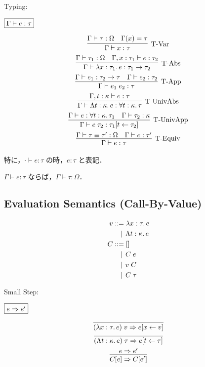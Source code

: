 Typing:

$\fbox{$\Gamma \vdash e: \tau$}$

\begin{gather*}
  \infer[\text{T-Var}]{\Gamma \vdash x: \tau}{
    \Gamma \vdash \tau: \Omega
    &
    \Gamma(x) = \tau
  }
  \\
  \infer[\text{T-Abs}]{\Gamma \vdash \lambda x: \tau_1\ldotp e: \tau_1 \to \tau_2}{
    \Gamma \vdash \tau_1: \Omega
    &
    \Gamma, x: \tau_1 \vdash e: \tau_2
  }
  \\
  \infer[\text{T-App}]{\Gamma \vdash e_1\; e_2: \tau}{
    \Gamma \vdash e_1: \tau_2 \to \tau
    &
    \Gamma \vdash e_2: \tau_2
  }
  \\
  \infer[\text{T-UnivAbs}]{\Gamma \vdash \Lambda t: \kappa\ldotp e: \forall t: \kappa\ldotp \tau}{
    \Gamma, t: \kappa \vdash e: \tau
  }
  \\
  \infer[\text{T-UnivApp}]{\Gamma \vdash e\; \tau_2: \tau_1[t \assign \tau_2]}{
    \Gamma \vdash e: \forall t: \kappa\ldotp \tau_1
    &
    \Gamma \vdash \tau_2: \kappa
  }
  \\
  \infer[\text{T-Equiv}]{\Gamma \vdash e: \tau}{
    \Gamma \vdash \tau \equiv \tau': \Omega
    &
    \Gamma \vdash e: \tau'
  }
\end{gather*}

特に，$\cdot \vdash e: \tau$ の時，$e: \tau$ と表記．

\begin{theorem}
  $\Gamma \vdash e: \tau$ ならば，$\Gamma \vdash \tau: \Omega$．
\end{theorem}

\subsection{Evaluation Semantics (Call-By-Value)}

\begin{align*}
  v
  &\BNFassign \lambda x: \tau\ldotp e \\
  &\BNFor \Lambda t: \kappa\ldotp e \\
  C
  &\BNFassign [] \\
  &\BNFor C\; e \\
  &\BNFor v\; C \\
  &\BNFor C\; \tau
\end{align*}

Small Step:

$\fbox{$e \Rightarrow e'$}$

\begin{gather*}
  \infer{(\lambda x: \tau\ldotp e)\; v \smalleval e[x \assign v]}{}
  \\
  \infer{(\Lambda t: \kappa\ldotp e)\; \tau \smalleval e[t \assign \tau]}{}
  \\
  \infer{C[e] \smalleval C[e']}{
    e \smalleval e'
  }
\end{gather*}

